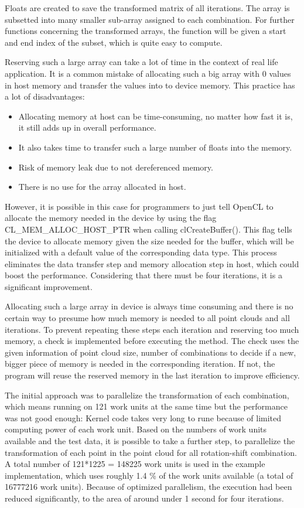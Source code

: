 Floats are created to save the transformed matrix of all iterations. The array is subsetted into many smaller sub-array assigned to each combination. For further functions concerning the transformed arrays, the function will be given a start and end index of the subset, which is quite easy to compute.

Reserving such a large array can take a lot of time in the context of real life application. It is a common mistake of allocating such a big array with 0 values in host memory and transfer the values into to device memory. This practice has a lot of disadvantages:
\begin{itemize}
\item Allocating memory at host can be time-consuming, no matter how fast it is, it still adds up in overall performance.
\item It also takes time to transfer such a large number of floats into the memory.
\item Risk of memory leak due to not dereferenced memory.
\item There is no use for the array allocated in host.
\end{itemize}
However, it is possible in this case for programmers to just tell OpenCL to allocate the memory needed in the device by using the flag CL\_MEM\_ALLOC\_HOST\_PTR when calling clCreateBuffer(). This flag tells the device to allocate memory given the size needed for the buffer, which will be initialized with a default value of the corresponding data type. This process eliminates the data transfer step and memory allocation step in host, which could boost the performance. Considering that there must be four iterations, it is a significant improvement.

Allocating such a large array in device is always time consuming and there is no certain way to presume how much memory is needed to all point clouds and all iterations. To prevent repeating these steps each iteration and reserving too much memory, a check is implemented before executing the method. The check uses the given information of point cloud size, number of combinations to decide if a new, bigger piece of memory is needed in the corresponding iteration. If not, the program will reuse the reserved memory in the last iteration to improve efficiency. 

The initial approach was to parallelize the transformation of each combination, which means running on 121 work units at the same time but the performance was not good enough: Kernel code takes very long to rune because of limited computing power of each work unit. Based on the numbers of work units available and the test data, it is possible to take a further step, to parallelize the transformation of each point in the point cloud for all rotation-shift combination. A total number of  121*1225 = 148225 work units is used in the example implementation, which uses roughly 1.4 \% of the work units available (a total of 16777216 work units). Because of optimized parallelism, the execution had been reduced significantly, to the area of around under 1 second for four iterations. 

